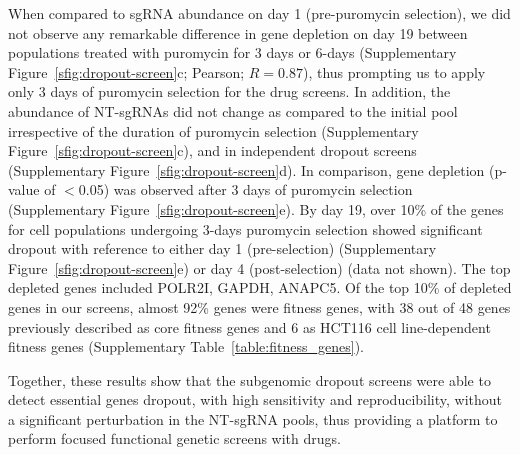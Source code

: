When compared to sgRNA abundance on day 1 (pre-puromycin selection), we did not observe any remarkable difference in gene depletion on day 19 between populations treated with puromycin for 3 days or 6-days (Supplementary Figure~\ref{sfig:dropout-screen}c; Pearson; $R=0.87$), thus prompting us to apply only 3 days of puromycin selection for the drug screens. 
In addition, the abundance of NT-sgRNAs did not change as compared to the initial pool irrespective of the duration of puromycin selection (Supplementary Figure~\ref{sfig:dropout-screen}c), and in independent dropout screens (Supplementary Figure~\ref{sfig:dropout-screen}d). 
In comparison, gene depletion (p-value of $<$0.05) was observed after 3 days of puromycin selection (Supplementary Figure~\ref{sfig:dropout-screen}e). 
By day 19, over 10\% of the genes for cell populations undergoing 3-days puromycin selection showed significant dropout with reference to either day 1 (pre-selection) (Supplementary Figure~\ref{sfig:dropout-screen}e) or day 4 (post-selection) (data not shown). 
The top depleted genes included POLR2I, GAPDH, ANAPC5. Of the top 10\% of depleted genes in our screens, almost 92\% genes were fitness genes, with 38 out of 48 genes previously described as core fitness genes and 6 as HCT116 cell line-dependent fitness genes (Supplementary Table~\ref{table:fitness_genes})\cite{Hart2015}.

Together, these results show that the subgenomic dropout screens were able to detect essential genes dropout, with high sensitivity and reproducibility, without a significant perturbation in the NT-sgRNA pools, thus providing a platform to perform focused functional genetic screens with drugs. 


